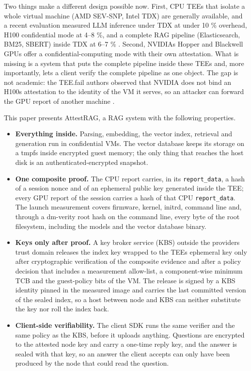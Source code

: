 \documentclass[letterpaper,twocolumn,10pt]{article}
\providecommand{\tightlist}{\setlength{\itemsep}{0pt}\setlength{\parskip}{0pt}}
\begin{document}
Two things make a different design possible now. First, CPU TEEs that isolate a whole virtual machine (AMD SEV-SNP, Intel TDX) are generally available, and a recent evaluation measured LLM inference under TDX at under 10 \% overhead, H100 confidential mode at 4--8 \%, and a complete RAG pipeline (Elasticsearch, BM25, SBERT) inside TDX at 6--7 \% \cite{chrapek2025confidential}. Second, NVIDIA\textquotesingle s Hopper and Blackwell GPUs offer a confidential-computing mode with their own attestation. What is missing is a system that puts the complete pipeline inside these TEEs and, more importantly, lets a client verify the complete pipeline as one object. The gap is not academic: the TEE.fail authors observed that NVIDIA does not bind an H100\textquotesingle s attestation to the identity of the VM it serves, so an attacker can forward the GPU report of another machine \cite{chuang2025teefail}.

This paper presents AttestRAG, a RAG system with the following properties.

\begin{itemize}
\tightlist
\item
  \textbf{Everything inside.} Parsing, embedding, the vector index, retrieval and generation run in confidential VMs. The vector database keeps its storage on a tmpfs inside encrypted guest memory; the only thing that reaches the host disk is an authenticated-encrypted snapshot.
\item
  \textbf{One composite proof.} The CPU report carries, in its \texttt{report\_data}, a hash of a session nonce and of an ephemeral public key generated inside the TEE; every GPU report of the session carries a hash of that CPU \texttt{report\_data}. The launch measurement covers firmware, kernel, initrd, command line and, through a dm-verity root hash on the command line, every byte of the root filesystem, including the models and the vector database binary.
\item
  \textbf{Keys only after proof.} A key broker service (KBS) outside the provider\textquotesingle s trust domain releases the index key wrapped to the TEE\textquotesingle s ephemeral key only after cryptographic verification of the composite evidence and after a policy decision that includes a measurement allow-list, a component-wise minimum TCB and the guest-policy bits of the VM. The release is signed by a KBS identity pinned in the measured image and carries the last committed version of the sealed index, so a host between node and KBS can neither substitute the key nor roll the index back.
\item
  \textbf{Client-side verifiability.} The client SDK runs the same verifier and the same policy as the KBS, before it uploads anything. Questions are encrypted to the attested node key and carry a one-time reply key, and the answer is sealed with that key, so an answer the client accepts can only have been produced by the node that could read the question.
\end{itemize}
\end{document}
